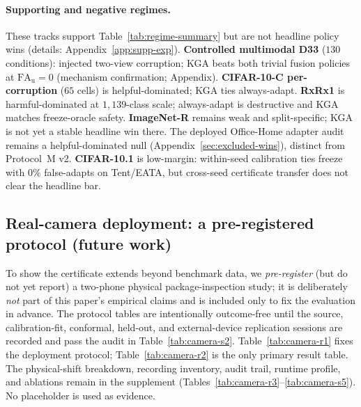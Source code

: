 \documentclass[conference]{IEEEtran}
\theoremstyle{plain}
\theoremstyle{definition}
\theoremstyle{remark}
\begin{document}
\paragraph{Supporting and negative regimes.}
These tracks support Table~\ref{tab:regime-summary} but are not headline policy wins
(details: Appendix~\ref{app:supp-exp}).
\textbf{Controlled multimodal D33} ($130$ conditions): injected two-view corruption;
\textsc{KGA} beats both trivial fusion policies at $\mathrm{FA}_{\mathrm u}{=}0$ (mechanism
confirmation; Appendix).
\textbf{CIFAR-10-C per-corruption} ($65$ cells) is helpful-dominated; \textsc{KGA} ties
always-adapt.
\textbf{RxRx1} is harmful-dominated at $1{,}139$-class scale; always-adapt is destructive
and \textsc{KGA} matches freeze-oracle safety.
\textbf{ImageNet-R} remains weak and split-specific; \textsc{KGA} is not yet a stable
headline win there. The deployed Office-Home adapter audit remains a helpful-dominated
null (Appendix~\ref{sec:excluded-wins}), distinct from Protocol~M v2.
\textbf{CIFAR-10.1} is low-margin: within-seed calibration ties freeze with $0\%$
false-adapts on Tent/EATA, but cross-seed certificate transfer does not clear the
headline bar.

\subsection{Real-camera deployment: a pre-registered protocol (future work)}
To show the certificate extends beyond benchmark data, we \emph{pre-register} (but do not yet
report) a two-phone physical package-inspection study; it is deliberately \emph{not} part of this
paper's empirical claims and is included only to fix the evaluation in advance. The protocol
tables are intentionally outcome-free until the source, calibration-fit, conformal,
held-out, and external-device replication sessions are recorded and pass the audit in
Table~\ref{tab:camera-s2}. Table~\ref{tab:camera-r1} fixes the deployment protocol;
Table~\ref{tab:camera-r2} is the only primary result table. The physical-shift breakdown,
recording inventory, audit trail, runtime profile, and ablations remain in the supplement
(Tables~\ref{tab:camera-r3}--\ref{tab:camera-s5}). No placeholder is used as evidence.


\end{document}
